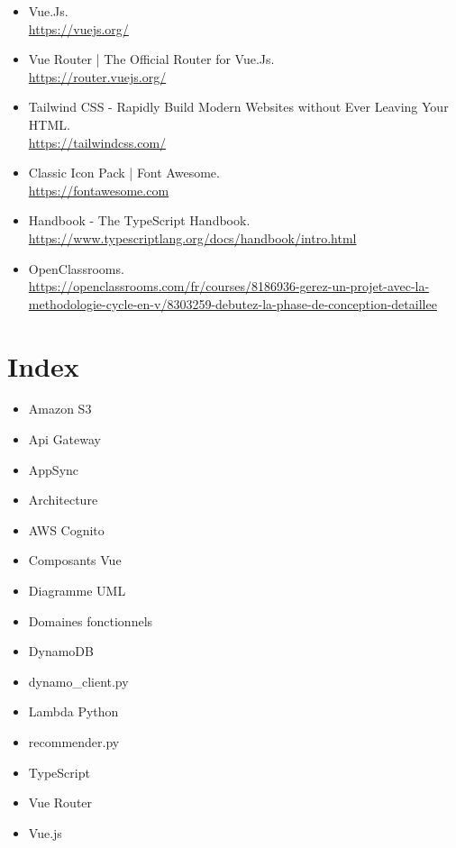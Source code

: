 \documentclass[a4paper,12pt]{report}
\begin{document}
\begin{itemize}
    \item Vue.Js.\\
    \url{https://vuejs.org/}

    \item Vue Router | The Official Router for Vue.Js.\\
    \url {https://router.vuejs.org/}

    \item Tailwind CSS - Rapidly Build Modern Websites without Ever Leaving Your HTML.\\
    \url {https://tailwindcss.com/}

    \item Classic Icon Pack | Font Awesome.\\
    \url{https://fontawesome.com}

    \item Handbook - The TypeScript Handbook. \\
\url{https://www.typescriptlang.org/docs/handbook/intro.html}
     \item OpenClassrooms. \\
     \url{https://openclassrooms.com/fr/courses/8186936-gerez-un-projet-avec-la-methodologie-cycle-en-v/8303259-debutez-la-phase-de-conception-detaillee}


\end{itemize}

\chapter*{Index}
\begin{itemize}
    \item Amazon S3 \pageref{s3}
    \item Api Gateway  \pageref{api}
     \item AppSync \pageref{api} 
    \item Architecture \pageref{archi}
    \item AWS Cognito \pageref{cogn} 
    \item Composants Vue \pageref{cv}
    \item Diagramme UML \pageref{UML}
    \item Domaines fonctionnels \pageref{df}
    \item DynamoDB \pageref{dyna}
    \item dynamo\_client.py \pageref{dynamo}
    \item Lambda Python \pageref{lamb}
    \item recommender.py \pageref{recom} 
    \item TypeScript \pageref{ts}   
    \item Vue Router \pageref{vr}
    \item Vue.js \pageref{vue}
\end{itemize}
\end{document}
